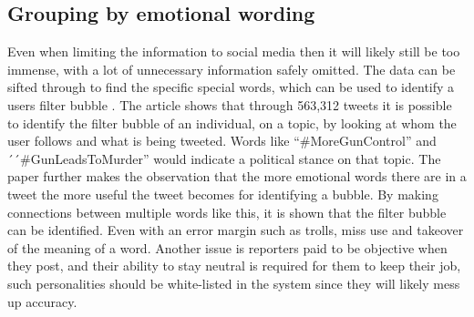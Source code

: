 \subsection{Grouping by emotional wording}\label{emotions}
Even when limiting the information to social media then it will likely still be
too immense, with a lot of unnecessary information safely omitted. The data can
be sifted through to find the specific special words, which can be used to
identify a users filter bubble \citep{EmotionalWords}. The article shows that
through 563,312 tweets it is possible to identify the filter bubble of an
individual, on a topic, by looking at whom the user follows and what is being
tweeted. Words like ``\#MoreGunControl'' and  ´´\#GunLeadsToMurder'' would
indicate a political stance on that topic. The paper further makes the
observation that the more emotional words there are in a tweet the more useful
the tweet becomes for identifying a bubble. By making connections between
multiple words like this, it is shown that the filter bubble can be identified.
Even with an error margin such as trolls, miss use and takeover of the meaning
of a word. Another issue is reporters paid to be objective when they post, and
their ability to stay neutral is required for them to keep their job, such
personalities should be white-listed in the system since they will likely mess
up accuracy.